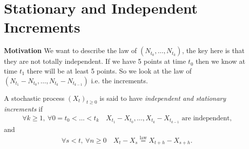 \section{Stationary and Independent Increments}
{\color{blue}
\textbf{Motivation} We want to describe the law of $(N_{t_0}, \ldots ,N_{t_k})$, the key here is that they are not totally independent. If we have 5 points at time $t_0$ then we know at time $t_1$ there will be at least 5 points. So we look at the law of $(N_{t_1}-N_{t_0}, \ldots ,N_{t_k}-N_{t_{k-1}})$ i.e. the increments.}

\begin{defn}
	A stochastic process $(X_t)_{t\geq 0}$ is said to have \emph{independent and stationary increments} if 
	\begin{align}
		\forall k \geq 1,\  \forall 0=t_0 <  \ldots  < t_k \quad  X_{t_1}-X_{t_0},  \ldots , X_{t_k}- X _{t_{k-1}} \textrm{ are independent,}
		\end{align}
		and
		\begin{align}
		\forall  s<t,\ \forall  n \geq 0 \quad X_t - X_s \stackrel{\textrm{law}}{=} X_{t+h}-X_{s+h}.
	\end{align}
\end{defn}

